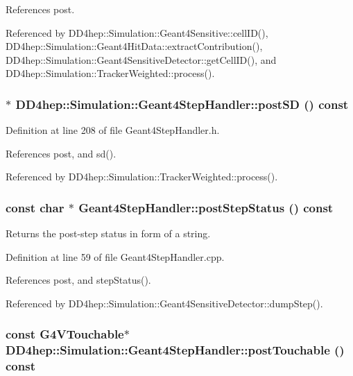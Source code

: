 References post.

Referenced by DD4hep::Simulation::Geant4Sensitive::cellID(), DD4hep::Simulation::Geant4HitData::extractContribution(), DD4hep::Simulation::Geant4SensitiveDetector::getCellID(), and DD4hep::Simulation::TrackerWeighted::process().\hypertarget{class_d_d4hep_1_1_simulation_1_1_geant4_step_handler_a9974306f45eb485f2463808f0dd96280}{
\subsubsection[{postSD}]{$\ast$ DD4hep::Simulation::Geant4StepHandler::postSD () const}}
\label{class_d_d4hep_1_1_simulation_1_1_geant4_step_handler_a9974306f45eb485f2463808f0dd96280}


Definition at line 208 of file Geant4StepHandler.h.

References post, and sd().

Referenced by DD4hep::Simulation::TrackerWeighted::process().\hypertarget{class_d_d4hep_1_1_simulation_1_1_geant4_step_handler_a607960c9505518f75ad1c9feb3afa935}{
\subsubsection[{postStepStatus}]{\setlength{\rightskip}{0pt plus 5cm}const char $\ast$ Geant4StepHandler::postStepStatus () const}}
\label{class_d_d4hep_1_1_simulation_1_1_geant4_step_handler_a607960c9505518f75ad1c9feb3afa935}


Returns the post-\/step status in form of a string. 

Definition at line 59 of file Geant4StepHandler.cpp.

References post, and stepStatus().

Referenced by DD4hep::Simulation::Geant4SensitiveDetector::dumpStep().\hypertarget{class_d_d4hep_1_1_simulation_1_1_geant4_step_handler_a886d0adf0ab8439d86f59505f92d7389}{
\subsubsection[{postTouchable}]{\setlength{\rightskip}{0pt plus 5cm}const G4VTouchable$\ast$ DD4hep::Simulation::Geant4StepHandler::postTouchable () const}}
\label{class_d_d4hep_1_1_simulation_1_1_geant4_step_handler_a886d0adf0ab8439d86f59505f92d7389}


